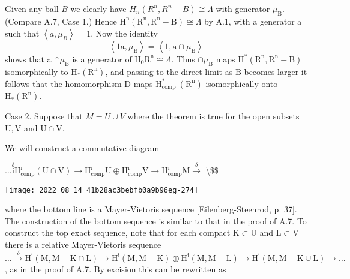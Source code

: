\documentclass[10pt]{article}
\begin{document}
Given any ball $B$ we clearly have $H_{n}\left(R^{n}, R^{n}-B\right) \cong \Lambda$ with generator $\mu_{\mathrm{B}}$. (Compare A.7, Case 1.) Hence $\mathrm{H}^{\mathrm{n}}\left(\mathrm{R}^{\mathrm{n}}, \mathrm{R}^{\mathrm{n}}-\mathrm{B}\right) \cong \Lambda$ by A.1, with a generator a such that $\left\langle a, \mu_{B}\right\rangle=1$. Now the identity
$$
\left\langle 1 \mathrm{a}, \mu_{\mathrm{B}}\right\rangle=\left\langle 1, \mathrm{a} \cap \mu_{\mathrm{B}}\right\rangle
$$
shows that a $\cap \mu_{\mathrm{B}}$ is a generator of $\mathrm{H}_{0} \mathrm{R}^{\mathrm{n}} \cong \Lambda$. Thus $\cap \mu_{\mathrm{B}}$ maps $\mathrm{H}^{*}\left(\mathrm{R}^{\mathrm{n}}, \mathrm{R}^{\mathrm{n}}-\mathrm{B}\right)$ isomorphically to $\mathrm{H}_{*}\left(\mathrm{R}^{\mathrm{n}}\right)$, and passing to the direct limit as $\mathrm{B}$ becomes larger it follows that the homomorphism $\mathrm{D}$ maps $\mathrm{H}_{\text {comp }}^{*}\left(\mathrm{R}^{\mathrm{n}}\right)$ isomorphically onto $\mathrm{H}_{*}\left(\mathrm{R}^{\mathrm{n}}\right)$.

Case 2. Suppose that $M=U \cup V$ where the theorem is true for the open subsets $\mathrm{U}, \mathrm{V}$ and $\mathrm{U} \cap \mathrm{V}$.

We will construct a commutative diagram

$\ldots \stackrel{\delta}{\mathrm{i}} \mathrm{H}_{\mathrm{comp}}^{\mathrm{i}}(\mathrm{U} \cap \mathrm{V}) \longrightarrow \mathrm{H}_{\mathrm{comp}}^{\mathrm{i}} \mathrm{U} \oplus \mathrm{H}_{\mathrm{comp}}^{\mathrm{i}} \mathrm{V} \longrightarrow \mathrm{H}_{\mathrm{comp}}^{\mathrm{i}} \mathrm{M} \stackrel{\delta}{\longrightarrow}$ \textbackslash  \$\$

\texttt{[image: 2022\_08\_14\_41b28ac3bebfb0a9b96eg-274]}

where the bottom line is a Mayer-Vietoris sequence [Eilenberg-Steenrod, p. 37]. The construction of the bottom sequence is similar to that in the proof of A.7. To construct the top exact sequence, note that for each compact $\mathrm{K} \subset \mathrm{U}$ and $\mathrm{L} \subset \mathrm{V}$ there is a relative Mayer-Vietoris sequence $\ldots \stackrel{\delta}{\rightarrow} \mathrm{H}^{\mathrm{i}}(\mathrm{M}, \mathrm{M}-\mathrm{K} \cap \mathrm{L}) \longrightarrow \mathrm{H}^{\mathrm{i}}(\mathrm{M}, \mathrm{M}-\mathrm{K}) \oplus \mathrm{H}^{\mathrm{i}}(\mathrm{M}, \mathrm{M}-\mathrm{L}) \longrightarrow \mathrm{H}^{\mathrm{i}}(\mathrm{M}, \mathrm{M}-\mathrm{K} \cup \mathrm{L}) \longrightarrow \ldots$, as in the proof of A.7. By excision this can be rewritten as
\end{document}
